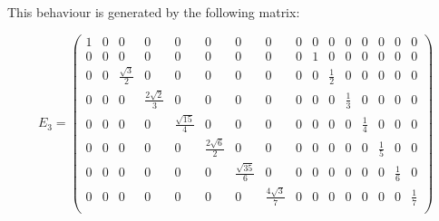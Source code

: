 \documentclass[12pt]{extarticle}
\begin{document}
\setcounter{MaxMatrixCols}{20}

This behaviour is generated by the following matrix:
\begin{small}
\[
E_3 = \begin{pmatrix}
1 &  0 & 0                   & 0                   & 0                   & 0                   & 0                   & 0                   & 0 & 0  & 0                  & 0                   & 0                   & 0                   & 0                   & 0 \\
0 &  0 & 0                   & 0                   & 0                   & 0                   & 0                   & 0                   & 0 & 1  & 0                  & 0                   & 0                   & 0                   & 0                   & 0 \\
0 &  0 & \frac{\sqrt{3}}{2}  & 0                   & 0                   & 0                   & 0                   & 0                   & 0 & 0  & \frac{1}{2}        & 0                   & 0                   & 0                   & 0                   & 0 \\
0 &  0 & 0                   & \frac{2\sqrt{2}}{3} & 0                   & 0                   & 0                   & 0                   & 0 & 0  & 0                  & \frac{1}{3}         & 0                   & 0                   & 0                   & 0 \\
0 &  0 & 0                   & 0                   & \frac{\sqrt{15}}{4} & 0                   & 0                   & 0                   & 0 & 0  & 0                  & 0                   & \frac{1}{4}         & 0                   & 0                   & 0 \\
0 &  0 & 0                   & 0                   & 0                   & \frac{2\sqrt{6}}{2} & 0                   & 0                   & 0 & 0  & 0                  & 0                   & 0                   & \frac{1}{5}         & 0                   & 0 \\
0 &  0 & 0                   & 0                   & 0                   & 0                   & \frac{\sqrt{35}}{6} & 0                   & 0 & 0  & 0                  & 0                   & 0                   & 0                   & \frac{1}{6}         & 0 \\
0 &  0 & 0                   & 0                   & 0                   & 0                   & 0                   & \frac{4\sqrt{3}}{7} & 0 & 0  & 0                  & 0                   & 0                   & 0                   & 0                   & \frac{1}{7} \\

\end{pmatrix}\]
\end{small}
\end{document}

